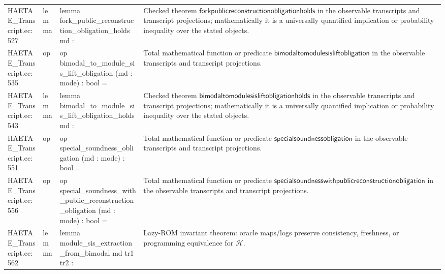 \documentclass[10pt]{article}
\begin{document}
\begin{longtable}{L{0.11\textwidth}L{0.055\textwidth}L{0.385\textwidth}L{0.41\textwidth}}
HAETAE\_\allowbreak{}Transcript.\allowbreak{}ec:\allowbreak{}527 & lemma & {\ttfamily\scriptsize lemma fork\_\allowbreak{}public\_\allowbreak{}reconstruction\_\allowbreak{}obligation\_\allowbreak{}holds md :} & Checked theorem $\mathsf{forkpublicreconstructionobligationholds}$ in the observable transcripts and transcript projections; mathematically it is a universally quantified implication or probability inequality over the stated objects. \\
HAETAE\_\allowbreak{}Transcript.\allowbreak{}ec:\allowbreak{}535 & op & {\ttfamily\scriptsize op bimodal\_\allowbreak{}to\_\allowbreak{}module\_\allowbreak{}sis\_\allowbreak{}lift\_\allowbreak{}obligation (md : mode) : bool =} & Total mathematical function or predicate $\mathsf{bimodaltomodulesisliftobligation}$ in the observable transcripts and transcript projections. \\
HAETAE\_\allowbreak{}Transcript.\allowbreak{}ec:\allowbreak{}543 & lemma & {\ttfamily\scriptsize lemma bimodal\_\allowbreak{}to\_\allowbreak{}module\_\allowbreak{}sis\_\allowbreak{}lift\_\allowbreak{}obligation\_\allowbreak{}holds md :} & Checked theorem $\mathsf{bimodaltomodulesisliftobligationholds}$ in the observable transcripts and transcript projections; mathematically it is a universally quantified implication or probability inequality over the stated objects. \\
HAETAE\_\allowbreak{}Transcript.\allowbreak{}ec:\allowbreak{}551 & op & {\ttfamily\scriptsize op special\_\allowbreak{}soundness\_\allowbreak{}obligation (md : mode) : bool =} & Total mathematical function or predicate $\mathsf{specialsoundnessobligation}$ in the observable transcripts and transcript projections. \\
HAETAE\_\allowbreak{}Transcript.\allowbreak{}ec:\allowbreak{}556 & op & {\ttfamily\scriptsize op special\_\allowbreak{}soundness\_\allowbreak{}with\_\allowbreak{}public\_\allowbreak{}reconstruction\_\allowbreak{}obligation (md : mode) : bool =} & Total mathematical function or predicate $\mathsf{specialsoundnesswithpublicreconstructionobligation}$ in the observable transcripts and transcript projections. \\
HAETAE\_\allowbreak{}Transcript.\allowbreak{}ec:\allowbreak{}562 & lemma & {\ttfamily\scriptsize lemma module\_\allowbreak{}sis\_\allowbreak{}extraction\_\allowbreak{}from\_\allowbreak{}bimodal md tr1 tr2 :} & Lazy-ROM invariant theorem: oracle maps/logs preserve consistency, freshness, or programming equivalence for $\mathcal H$. \\

\end{longtable}
\end{document}
